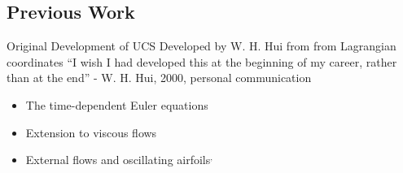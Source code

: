 \documentclass{beamer}
\begin{document}
\subsection{Previous Work}
\begin{frame}{Original Development of UCS}
  Developed by W. H. Hui\cite{hui07} from from Lagrangian coordinates
  \vspace{.025in}
    ``I wish I had developed this at the beginning of my career,
    rather than at the end'' - W. H. Hui, 2000, personal communication
  \begin{itemize}
   \vspace{.025in}
    \item The time-dependent Euler equations\cite{hui99}\cite{hui01}
    \item Extension to viscous flows\cite{huiviscous07}
    \item External flows and oscillating airfoils\cite{hui04}$^,$\cite{huigridless}
  \end{itemize}
\end{frame}
\end{document}
